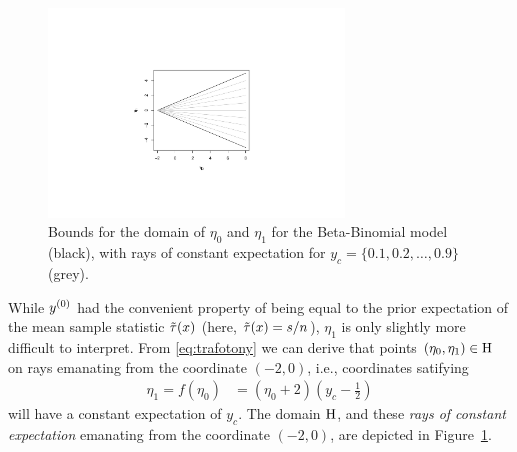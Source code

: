 \begin{figure}  %
\centering
\includegraphics[trim = 80mm 45mm 80mm 60mm, clip, width=0.7\textwidth]{R/boatshape-domain}%
\caption[Bounds for the domain of $\eta_0$ and $\eta_1$ for the Beta-Binomial model,
with rays of constant expectation for $y_c = \{0.1,0.2,\ldots,0.9\}$.]%
{Bounds for the domain of $\eta_0$ and $\eta_1$ for the Beta-Binomial model (black),
with rays of constant expectation for $y_c = \{0.1,0.2,\ldots,0.9\}$ (grey).}
\label{fig:boatshape-domain}
\end{figure}

While $y^{(0)}$ had the convenient property of being equal to
the prior expectation of the mean sample statistic $\tilde{\tau}(x)$ (here, $\tilde{\tau}(x) = s/n$),
$\eta_1$ is only slightly more difficult to interpret.
From \eqref{eq:trafotony} we can derive that points $(\eta_0,\eta_1) \in \mathrm{H}$
on rays emanating from the coordinate $(-2,0)$,
i.e., coordinates satifying
\begin{align}
\label{eq:raysofconstantexpectation}
\eta_1 = f(\eta_0) &= (\eta_0 + 2)(y_c - \frac{1}{2}) 
\end{align}
will have a constant expectation of $y_c$.
The domain $\mathrm{H}$, and these \emph{rays of constant expectation} emanating from the coordinate $(-2,0)$,
are depicted in Figure~\ref{fig:boatshape-domain}.




